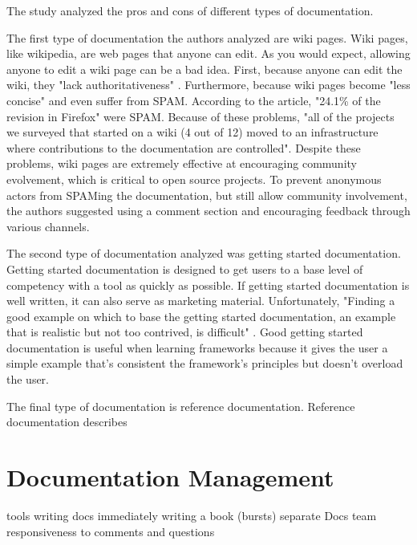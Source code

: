 \documentclass[titlepage]{article}
\begin{document}
The study analyzed the pros and cons of different types of documentation. 

The first type of documentation the authors analyzed are wiki pages. Wiki pages, like wikipedia, are web pages that anyone can edit. As you would expect, allowing anyone to edit a wiki page can be a bad idea. First, because anyone can edit the wiki, they "lack authoritativeness" \cite[p.5]{Dagenais:2010:CED:1882291.1882312}. Furthermore, because wiki pages become "less concise" \cite[p.5]{Dagenais:2010:CED:1882291.1882312} and even suffer from SPAM. According to the article, "24.1\% of the revision in Firefox"\cite[p.5]{Dagenais:2010:CED:1882291.1882312} were SPAM. Because of these problems, "all of the projects we surveyed that started on a wiki (4 out of 12) moved to an infrastructure where contributions to the documentation are controlled"\cite[p.5]{Dagenais:2010:CED:1882291.1882312}. Despite these problems, wiki pages are extremely effective at encouraging community evolvement, which is critical to open source projects. To prevent anonymous actors from SPAMing the documentation, but still allow community involvement, the authors suggested using a comment section and encouraging feedback through various channels.

The second type of documentation analyzed was getting started documentation. Getting started documentation is designed to get users to a base level of competency with a tool as quickly as possible. If getting started documentation is well written, it can also serve as marketing material. Unfortunately, "Finding a good example on which to base the getting started documentation, an example that is realistic but not too contrived, is difficult" \cite[p.6 Contributor 11]{Dagenais:2010:CED:1882291.1882312}. Good getting started documentation is useful when learning frameworks because it gives the user a simple example that's consistent the framework's principles but doesn't overload the user.

The final type of documentation is reference documentation. Reference documentation describes 

\section{Documentation Management}

tools
writing docs immediately
writing a book (bursts)
separate Docs team
responsiveness to comments and questions



\end{document}
